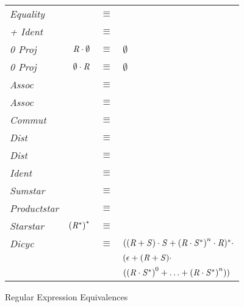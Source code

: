 \begin{figure}
\setcounter{rowcount}{0}
\centering
\begin{tabular}{>{\itshape\/}lrcl}
Equality & \Regex{} & $\equiv$ & \Regex{} \\
+ Ident & \RegexOr{\Regex}{\emptyset} & $\equiv$ & \Regex{} \\
0 Proj\SubRight{} & $\mathit{R}\cdot\emptyset$ & $\equiv$ & $\emptyset$ \\
0 Proj\SubLeft{} & $\emptyset\cdot\mathit{R}$ & $\equiv$ & $\emptyset$ \\
\Concat{} Assoc & \RegexConcat{(\RegexConcat{\Regex{}}{\Regex'})}{\Regex''} & $\equiv$ & \RegexConcat{\Regex{}}{(\RegexConcat{\Regex'}{\Regex''})} \\
\Or{} Assoc & \RegexOr{(\RegexOr{\Regex}{\Regex'})}{\Regex''} & $\equiv$ & \RegexOr{\Regex}{(\RegexOr{\Regex'}{\Regex''})} \\
\Or{} Commut & \RegexOr{\Regex{}}{\RegexAlt{}} & $\equiv$ & \RegexOr{\RegexAlt{}}{\Regex{}}\\
Dist\SubRight{} & \RegexConcat{\Regex{}}{(\RegexOr{\Regex{}'}{\Regex{}''})} & $\equiv$ & \RegexOr{(\RegexConcat{\Regex{}}{\Regex{}'})}{(\RegexConcat{\Regex{}}{\Regex{}''})} \\
Dist\SubLeft{} & \RegexConcat{(\RegexOr{\Regex{}'}{\Regex{}''})}{\Regex{}} & $\equiv$ & \RegexOr{(\RegexConcat{\Regex{}'}{\Regex{}})}{(\RegexConcat{\Regex{}''}{\Regex{}})} \\
\Concat{} Ident &\RegexConcat{\Regex{}}{\EmptyString{}} & $\equiv$ & \Regex{}\\
Sumstar &\StarOf{(\RegexOr{\Regex{}}{\RegexAlt{}})} & $\equiv$ & \RegexConcat{\StarOf{(\RegexConcat{\StarOf{\Regex{}}}{\RegexAlt{}})}}{\StarOf{\Regex{}}}\\
Productstar & \StarOf{(\RegexConcat{\Regex{}}{\RegexAlt{}})} & $\equiv$ & \RegexOr{\EmptyString{}}{(\RegexConcat{\RegexConcat{\Regex{}}{\StarOf{(\RegexConcat{\RegexAlt{}}{\Regex{}})}}}{\RegexAlt{}})}\\
Starstar & ${(\mathit{R}{}^*)}^*$ & $\equiv$ & \StarOf{\Regex{}}\\
Dicyc & \StarOf{(\RegexOr{\Regex}{\RegexAlt})} & $\equiv$ & $((\mathit{R}+\mathit{S})\cdot\mathit{S}+{(\mathit{R}\cdot\mathit{S}^*)}^n\cdot\mathit{R})^*\cdot$\\
& & & $(\epsilon+(\mathit{R}+\mathit{S})\cdot$\\
& & & $({(\mathit{R}\cdot\mathit{S}^*)}^0+\ldots+{(\mathit{R}\cdot\mathit{S}^*)}^n))$
\end{tabular}
\caption{Regular Expression Equivalences}
\label{fig:regex-equivalence-rules}
\end{figure}
